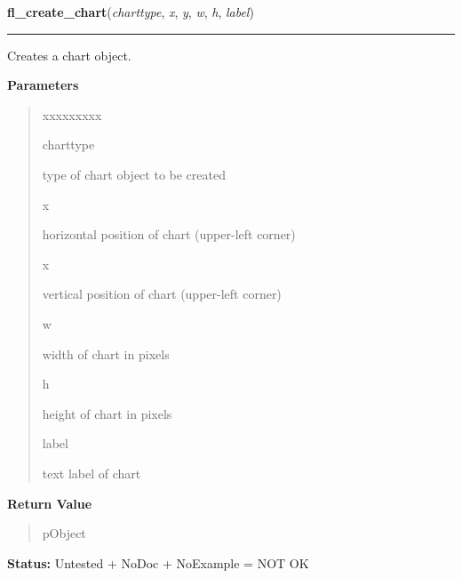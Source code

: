 \hspace{.8\funcindent}\begin{boxedminipage}{\funcwidth}

    \raggedright \textbf{fl\_create\_chart}(\textit{charttype}, \textit{x}, \textit{y}, \textit{w}, \textit{h}, \textit{label})

    \vspace{-1.5ex}

    \rule{\textwidth}{0.5\fboxrule}
\setlength{\parskip}{2ex}
    Creates a chart object.

\setlength{\parskip}{1ex}
      \textbf{Parameters}
      \vspace{-1ex}

      \begin{quote}
        \begin{Ventry}{xxxxxxxxx}

          \item[charttype]

          type of chart object to be created

          \item[x]

          horizontal position of chart (upper-left corner)

          \item[x]

          vertical position of chart (upper-left corner)

          \item[w]

          width of chart in pixels

          \item[h]

          height of chart in pixels

          \item[label]

          text label of chart

        \end{Ventry}

      \end{quote}

      \textbf{Return Value}
    \vspace{-1ex}

      \begin{quote}
      pObject

      \end{quote}

\textbf{Status:} Untested + NoDoc + NoExample = NOT OK



    \end{boxedminipage}

